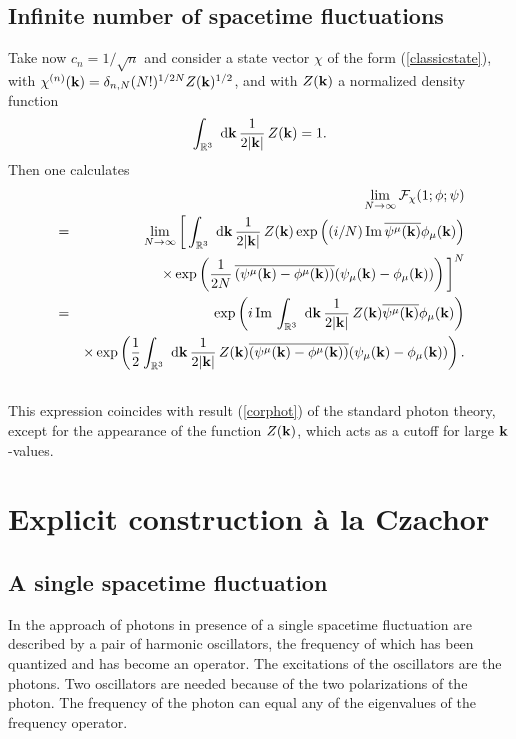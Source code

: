 \documentclass[12pt,a4paper]{article}
\def\Ro{{\mathbb R}}
\def\kk{{\bf k}}
\renewcommand{\Im}{\,{\rm Im}\,}
\begin{document}
\subsection{Infinite number of spacetime fluctuations} 

Take now $c_n=1/\sqrt n$ and consider a state vector $\chi$ of the form (\ref{classicstate}),
with $\chi^{(n)}(\kk)=\delta_{n,N}(N!)^{1/2N} Z(\kk)^{1/2}$, and with $Z(\kk)$
a normalized density function
\begin{equation}
\int_{\Ro^3}\hbox{ d}\kk\,\frac{1}{2|\kk|}\,Z(\kk)=1.
\end{equation}
Then one calculates
\begin{eqnarray}
& &\lim_{N\rightarrow\infty}
{\cal F}_\chi(1;\phi;\psi)\cr
&=&\lim_{N\rightarrow\infty}
\bigg[\int_{\Ro^3}\hbox{ d}\kk\,\frac{1}{2|\kk|}\,Z(\kk)
\exp\left((i/N)\Im\overline{ \psi^\mu(\kk)}\phi_\mu(\kk)
\right)\cr
& &\times\exp\left(
\frac{1}{2N}\,\overline{( \psi^\mu(\kk)-\phi^\mu(\kk))}
(\psi_\mu(\kk)-\phi_\mu(\kk))
\right)
\bigg]^N\cr
&=&\exp\left(i\Im
\int_{\Ro^3}\hbox{ d}\kk\,\frac{1}{2|\kk|}\,Z(\kk)
\overline{ \psi^\mu(\kk)}\phi_\mu(\kk)\right)\cr
& &\times
\exp\left(
\frac{1}{2}\int_{\Ro^3}\hbox{ d}\kk\,\frac{1}{2|\kk|}\,Z(\kk)
\overline{( \psi^\mu(\kk)-\phi^\mu(\kk))}
(\psi_\mu(\kk)-\phi_\mu(\kk))
\right).\cr
& &
\end{eqnarray}
This expression coincides with result (\ref{corphot}) of the standard
photon theory, except for the appearance of the function $Z(\kk)$,
which acts as a cutoff for large $\kk$-values.

\section{Explicit construction \`a la Czachor}



\subsection{A single spacetime fluctuation}

In the approach of \cite {CM00,CS01,CM02} photons in presence of
a single spacetime fluctuation are described by a pair of
harmonic oscillators, the frequency of which 
has been quantized and has become an operator. The excitations
of the oscillators are the photons. Two oscillators
are needed because of the two polarizations of the photon.
The frequency of the photon can equal any of the
eigenvalues of the frequency operator.
\end{document}
